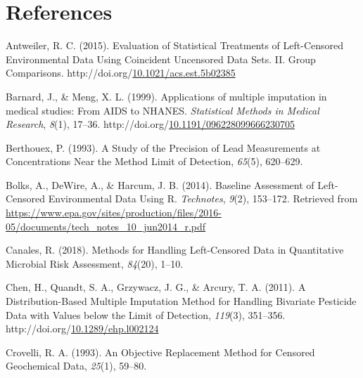 \documentclass[12pt, twoside]{amherstthesis}
\newenvironment{CSLReferences}%
  {}%
  {\par}
\begin{document}
\hypertarget{references}{%
\chapter*{References}\label{references}}

\noindent

\setlength{\parindent}{-0.20in}
\setlength{\leftskip}{0.20in}
\setlength{\parskip}{8pt}

\hypertarget{refs}{}
\begin{CSLReferences}{1}{0}
\leavevmode\hypertarget{ref-Antweiler2015}{}%
Antweiler, R. C. (2015). {Evaluation of Statistical Treatments of Left-Censored Environmental Data Using Coincident Uncensored Data Sets. II. Group Comparisons}. http://doi.org/\href{https://doi.org/10.1021/acs.est.5b02385}{10.1021/acs.est.5b02385}

\leavevmode\hypertarget{ref-Barnard1999}{}%
Barnard, J., \& Meng, X. L. (1999). {Applications of multiple imputation in medical studies: From AIDS to NHANES}. \emph{Statistical Methods in Medical Research}, \emph{8}(1), 17--36. http://doi.org/\href{https://doi.org/10.1191/096228099666230705}{10.1191/096228099666230705}

\leavevmode\hypertarget{ref-Berthouex1993}{}%
Berthouex, P. (1993). {A Study of the Precision of Lead Measurements at Concentrations Near the Method Limit of Detection}, \emph{65}(5), 620--629.

\leavevmode\hypertarget{ref-Bolks2014}{}%
Bolks, A., DeWire, A., \& Harcum, J. B. (2014). {Baseline Assessment of Left-Censored Environmental Data Using R}. \emph{Technotes}, \emph{9}(2), 153--172. Retrieved from \url{https://www.epa.gov/sites/production/files/2016-05/documents/tech_notes_10_jun2014_r.pdf}

\leavevmode\hypertarget{ref-Canales2018}{}%
Canales, R. (2018). {Methods for Handling Left-Censored Data in Quantitative Microbial Risk Assessment}, \emph{84}(20), 1--10.

\leavevmode\hypertarget{ref-Chen2011}{}%
Chen, H., Quandt, S. A., Grzywacz, J. G., \& Arcury, T. A. (2011). {A Distribution-Based Multiple Imputation Method for Handling Bivariate Pesticide Data with Values below the Limit of Detection}, \emph{119}(3), 351--356. http://doi.org/\href{https://doi.org/10.1289/ehp.l002124}{10.1289/ehp.l002124}

\leavevmode\hypertarget{ref-Crovelli1993}{}%
Crovelli, R. A. (1993). {An Objective Replacement Method for Censored Geochemical Data}, \emph{25}(1), 59--80.


\end{CSLReferences}
\end{document}
